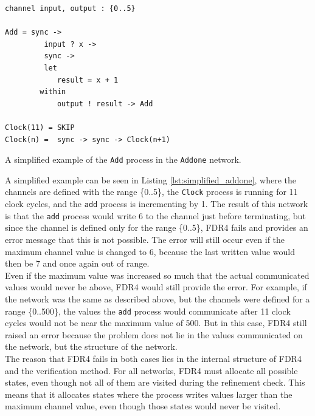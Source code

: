\begin{listing}
\begin{verbatim}
channel input, output : {0..5}

Add = sync ->
         input ? x ->
         sync ->
         let
            result = x + 1
        within
            output ! result -> Add

Clock(11) = SKIP
Clock(n) =  sync -> sync -> Clock(n+1)
\end{verbatim}
\caption{A simplified example of the \texttt{Add} process in the \texttt{Addone} network.}
\label{lst:simplified_addone}
\end{listing}
A simplified example can be seen in Listing \ref{lst:simplified_addone}, where the channels are defined with the range \{0..5\}, the \texttt{Clock} process is running for 11 clock cycles, and the \texttt{add} process is incrementing by 1.
The result of this network is that the \texttt{add} process would write 6 to the channel just before terminating, but since the channel is defined only for the range \{0..5\}, FDR4 fails and provides an error message that this is not possible. The error will still occur even if the maximum channel value is changed to 6, because the last written value would then be 7 and once again out of range. \\

Even if the maximum value was increased so much that the actual communicated values would never be above, FDR4 would still provide the error.
For example, if the network was the same as described above, but the channels were defined for a range \{0..500\}, the values the \texttt{add} process would communicate after 11 clock cycles would not be near the maximum value of 500. But in this case, FDR4 still raised an error because the problem does not lie in the values communicated on the network, but the structure of the network. \\

The reason that FDR4 fails in both cases lies in the internal structure of FDR4 and the verification method. For all networks, FDR4 must allocate all possible states, even though not all of them are visited during the refinement check. This means that it allocates states where the process writes values larger than the maximum channel value, even though those states would never be visited.\\

